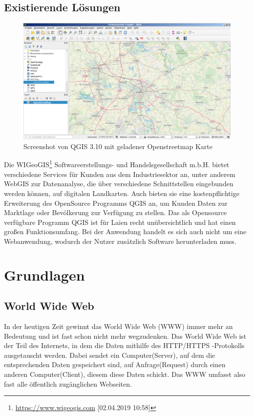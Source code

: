 \documentclass[a4paper, 12pt]{scrreprt}
\begin{document}
\section{Existierende Lösungen}
\begin{figure}[h]
\includegraphics[width=\linewidth]{qgis_oberflaeche.png}
\caption{Screenshot von QGIS 3.10 mit geladener Openstreetmap Karte}
\end{figure}
Die WIGeoGIS\footnote{\url{https://www.wigeogis.com} [02.04.2019 10:58]} Softwareerstellungs- und Handelsgesellschaft m.b.H. bietet verschiedene Services für Kunden aus dem Industriesektor an, unter anderem WebGIS zur Datenanalyse, die über verschiedene Schnittstellen eingebunden werden können, auf digitalen Landkarten. 
Auch bieten sie eine kostenpflichtige Erweiterung des OpenSource Programms QGIS an, um Kunden Daten zur Marktlage oder Bevölkerung zur Verfügung zu stellen.
Das als Opensource verfügbare Programm QGIS ist für Laien recht unübersichtlich und hat einen großen Funktionsumfang.
Bei der Anwendung handelt es sich auch nicht um eine Webanwendung, wodurch der Nutzer zusätzlich Software herunterladen muss.\\

\chapter{Grundlagen}
\section{World Wide Web}
In der heutigen Zeit gewinnt das World Wide Web (WWW) immer mehr an Bedeutung und ist fast schon nicht mehr wegzudenken.
Das World Wide Web ist der Teil des Internets, in dem die Daten mithilfe des HTTP/HTTPS -Protokolls ausgetauscht werden. Dabei sendet ein Computer(Server), auf dem die entsprechenden Daten gespeichert sind, auf Anfrage(Request) durch einen anderen Computer(Client), diesem diese Daten schickt.
Das WWW umfasst also fast alle öffentlich zugänglichen Webseiten.
\end{document}
